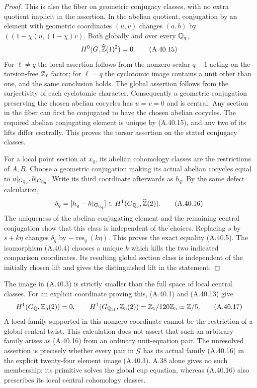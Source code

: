 \begin{proof}
This is also the fiber on geometric conjugacy classes, with
no extra quotient implicit in the assertion.  In the abelian
quotient, conjugation by an element with geometric coordinates
$(u,v)$ changes $(a,b)$ by
$((1-\chi)u,(1-\chi)v)$.  Both globally and over every
$\mathbb Q_q$,
\[
                  H^0(G,\widehat{\mathbb Z}(1)^2)=0.
 \tag{A.40.15}
\]
For $\ell\ne q$ the local assertion follows from the nonzero
scalar $q-1$ acting on the torsion-free $\mathbb Z_\ell$ factor;
for $\ell=q$ the cyclotomic image contains a unit other than
one, and the same conclusion holds.  The global assertion
follows from the surjectivity of each cyclotomic character.
Consequently a geometric conjugation preserving the chosen
abelian cocycles has $u=v=0$ and is central.  Any section in
the fiber can first be conjugated to have the chosen abelian
cocycles.  The required abelian conjugating element is unique
by (A.40.15), and any two of its lifts differ centrally.
This proves the torsor assertion on the stated conjugacy classes.

For a local point section at $x_q$, its abelian cohomology
classes are the restrictions of $A,B$.  Choose a geometric
conjugation making its actual abelian cocycles equal to
$a|_{G_{\mathbb Q_q}},b|_{G_{\mathbb Q_q}}$.  Write its third coordinate
afterwards as $h_q$.  By the same defect calculation,
\[
              \delta_q=[h_q-h|_{G_{\mathbb Q_q}}]
                    \in H^1(G_{\mathbb Q_q},\widehat{\mathbb Z}(2)).
 \tag{A.40.16}
\]
The uniqueness of the abelian conjugating element and the
remaining central conjugation show that this class is independent
of the choices.  Replacing $s$ by $s+k\eta$ changes
$\delta_q$ by $-\operatorname{res}_q(k\eta)$.
This proves the exact equality (A.40.5).  The isomorphism
(A.40.4) chooses a unique $k$ which kills the two indicated
comparison coordinates.  Its resulting global section class
is independent of the initially chosen lift and gives the
distinguished lift in the statement.
\end{proof}

The image in (A.40.3) is strictly smaller than the full space
of local central classes.  For an explicit coordinate proving
this, (A.40.1) and (A.40.13) give
\[
 H^1(G_\mathbb Q,\mathbb Z_5(2))=0,
 \qquad H^1(G_{\mathbb Q_{11}},\mathbb Z_5(2))
             =\mathbb Z_5/120\mathbb Z_5\simeq\mathbb Z/5.
 \tag{A.40.17}
\]
A local family supported in this nonzero coordinate cannot be
the restriction of a global central twist.  This calculation
does not assert that such an arbitrary family arises as
(A.40.16) from an ordinary unit-equation pair.  The unresolved
assertion is precisely whether every pair in $\mathcal G$
has its actual family (A.40.16) in the explicit twenty-four
element image (A.40.3).  A.38 alone gives no such membership:
its primitive solves the global cup equation, whereas (A.40.16)
also prescribes its local central cohomology classes.

